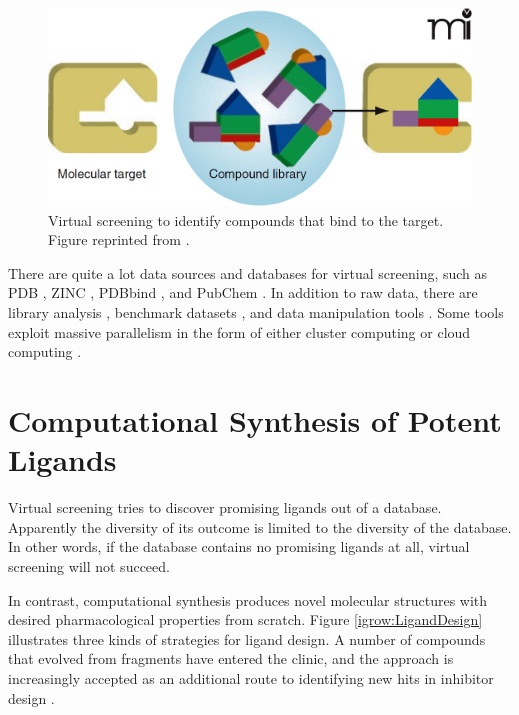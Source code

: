 \begin{figure}
\centering
\includegraphics[width=\textwidth]{Background/VirtualScreening.png}
\caption{Virtual screening to identify compounds that bind to the target. Figure reprinted from \citep{470}.}
\label{Background:VirtualScreening}
\end{figure}

There are quite a lot data sources and databases for virtual screening, such as PDB \citep{540,539,537,105,538}, ZINC \citep{532}, PDBbind \citep{529,530}, and PubChem \citep{526}. In addition to raw data, there are library analysis \citep{521}, benchmark datasets \citep{534,533,535,536}, and data manipulation tools \citep{542}. Some tools exploit massive parallelism in the form of either cluster computing or cloud computing \citep{557,773,560,782}.

\section{Computational Synthesis of Potent Ligands}

Virtual screening tries to discover promising ligands out of a database. Apparently the diversity of its outcome is limited to the diversity of the database. In other words, if the database contains no promising ligands at all, virtual screening will not succeed.

In contrast, computational synthesis produces novel molecular structures with desired pharmacological properties from scratch. Figure \ref{igrow:LigandDesign} \citep{363} illustrates three kinds of strategies for ligand design. A number of compounds that evolved from fragments have entered the clinic, and the approach is increasingly accepted as an additional route to identifying new hits in inhibitor design \citep{363,470}.

